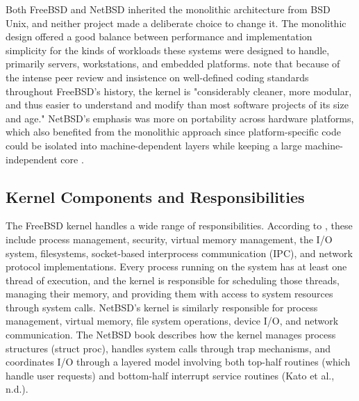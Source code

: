 Both FreeBSD and NetBSD inherited the monolithic architecture from BSD Unix, and neither project made a deliberate choice to change it. The monolithic design offered a good balance between performance and implementation simplicity for the kinds of workloads these systems were designed to handle, primarily servers, workstations, and embedded platforms. \textcite{watson2015} note that because of the intense peer review and insistence on well-defined coding standards throughout FreeBSD's history, the kernel is "considerably cleaner, more modular, and thus easier to understand and modify than most software projects of its size and age." NetBSD's emphasis was more on portability across hardware platforms, which also benefited from the monolithic approach since platform-specific code could be isolated into machine-dependent layers while keeping a large machine-independent core \parencite{feyrer2002}.


\subsection{Kernel Components and Responsibilities}
The FreeBSD kernel handles a wide range of responsibilities. According to \textcite{watson2015}, these include process management, security, virtual memory management, the I/O system, filesystems, socket-based interprocess communication (IPC), and network protocol implementations. Every process running on the system has at least one thread of execution, and the kernel is responsible for scheduling those threads, managing their memory, and providing them with access to system resources through system calls.
NetBSD's kernel is similarly responsible for process management, virtual memory, file system operations, device I/O, and network communication. The NetBSD book describes how the kernel manages process structures (struct proc), handles system calls through trap mechanisms, and coordinates I/O through a layered model involving both top-half routines (which handle user requests) and bottom-half interrupt service routines (Kato et al., n.d.).

